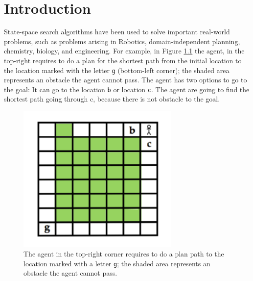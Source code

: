 

\chapter{Introduction}\label{aboutTheProblem}
\noindent
State-space search algorithms have been used to solve important real-world problems, such as problems arising in Robotics, domain-independent planning, chemistry, biology, and engineering. For example, in Figure \ref{fig:example_fix} the agent, in the top-right requires to do a plan for the shortest path from the initial location to the location marked with the letter \texttt{g} (bottom-left corner); the shaded area represents an obstacle the agent cannot pass. The agent has two options to go to the goal: It can go to the location \texttt{b} or location \texttt{c}. The agent are going to find the shortest path going through c, because there is not obstacle to the goal. 

\begin{figure}[h]
\centering
\includegraphics[width=8cm]{images/editarExampleLevi-Green}
\caption{The agent in the top-right corner requires to do a plan path to the location marked with a letter \texttt{g}; the shaded area represents an obstacle the agent cannot pass.} \label{fig:example_fix}
\end{figure}

